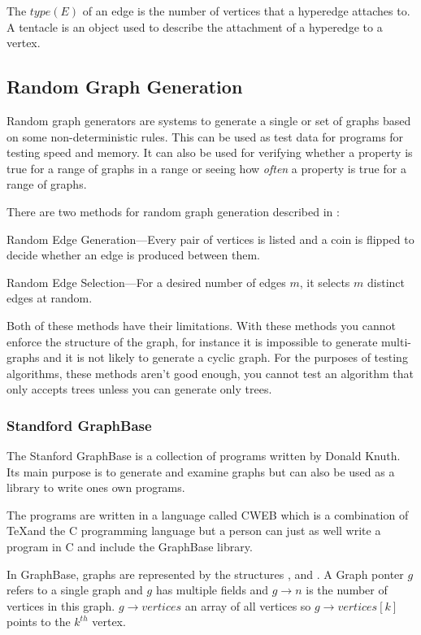   The $type(E)$ of an edge is the number of vertices that a hyperedge attaches to. A tentacle is an object used to describe the attachment of a hyperedge to a vertex.


  

\subsection{Random Graph Generation}
  Random graph generators are systems to generate a single or set of graphs based on some non-deterministic rules. This can be used as test data for programs for testing speed and memory. It can also be used for verifying whether a property is true for a range of graphs in a range or seeing how \emph{often} a property is true for a range of graphs.

  There are two methods for random graph generation described in \cite{Skiena}:

  Random Edge Generation---Every pair of vertices is listed and a coin is flipped to decide whether an edge is produced between them.

  Random Edge Selection---For a desired number of edges $m$, it selects $m$ distinct edges at random.

  Both of these methods have their limitations. With these methods you cannot enforce the structure of the graph, for instance it is impossible to generate multi-graphs and it is not likely to generate a cyclic graph. For the purposes of testing algorithms, these methods aren't good enough, you cannot test an algorithm that only accepts trees unless you can generate only trees.

  \subsubsection{Standford GraphBase}
    The Stanford GraphBase is a collection of programs written by Donald Knuth. Its main purpose is to generate and examine graphs but can also be used as a library to write ones own programs. 

    The programs are written in a language called CWEB which is a combination of \TeX and the C programming language but a person can just as well write a program in C and include the GraphBase library. 

    In GraphBase, graphs are represented by the structures ,  and . A Graph ponter $g$ refers to a single graph and $g$ has multiple fields and $g \to n$ is the number of vertices in this graph. $g \to vertices$ an array of all vertices so $g \to vertices[k]$ points to the $k^{th}$ vertex.

